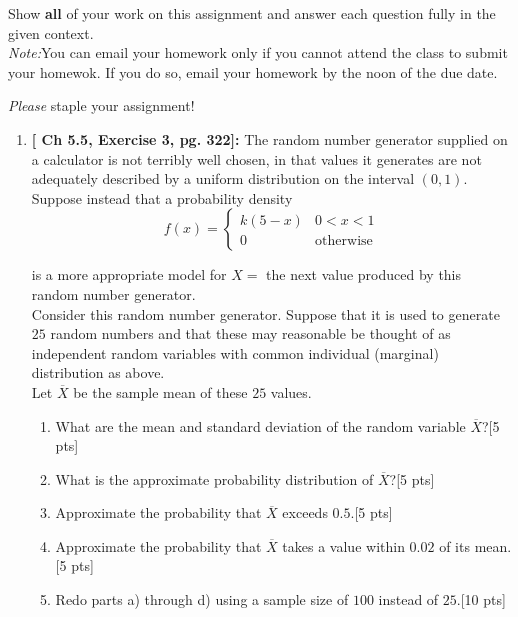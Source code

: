 \documentclass[11pt]{article}\usepackage[]{graphicx}\usepackage[]{color}
\begin{document}

\pagestyle{fancy} 

Show \textbf{all} of your work on this assignment and answer each question fully in the given context.\\

\emph{Note:}You can email your homework only if you cannot attend the class to submit your homewok. If you do so, email your homework by the noon of the due date. 


\emph{Please} staple your assignment!


\begin{enumerate}
	
    \item \textbf{[ Ch 5.5, Exercise 3, pg. 322]:} The random number generator supplied on a calculator is not terribly well chosen, in that values it generates are not adequately described by a uniform distribution on the interval $(0,1)$. Suppose instead that a probability density
    $$
    f(x) = \begin{cases} k(5 - x) & 0 < x< 1 \\ 0 & \text{otherwise}\end{cases}
    $$
    
    is a more appropriate model for $X =$ the next value produced by this random number generator.\\
    
    Consider  this random number generator. Suppose that it is used to generate $25$ random numbers and that these may reasonable be thought of as independent random variables with common individual (marginal) distribution as above.\\
Let $\overline{X}$ be the sample mean of these $25$ values.

    \begin{enumerate}
          \item What are the mean and standard deviation of the random variable $\overline{X}$?[5 pts]
          \item What is the approximate probability distribution of $\overline{X}$?[5 pts]
          \item Approximate the probability that $\overline{X}$ exceeds $0.5$.[5 pts]
          \item Approximate the probability that $\overline{X}$ takes a value within $0.02$ of its mean.[5 pts]
          \item Redo parts a) through d) using a sample size of $100$ instead of $25$.[10 pts]
    \end{enumerate}    
    

\end{enumerate}
\end{document}
